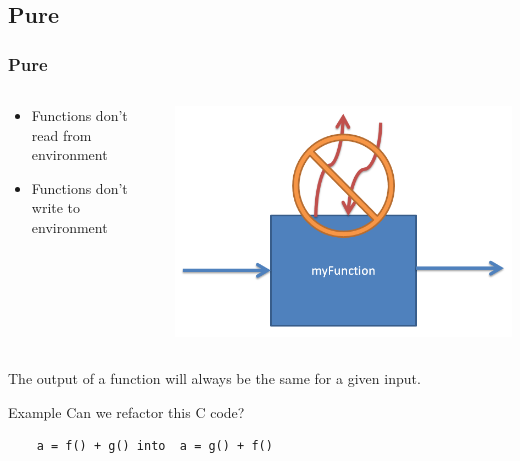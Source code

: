 \documentclass{beamer}
\begin{document}
\subsection{Pure}
\begin{frame}[fragile]
\frametitle{Pure}

 \begin{columns}[]
  \begin{column}[]{5cm}
   \begin{itemize}
    \item Functions don't read from environment
    \item Functions don't write to environment
   \end{itemize}
  \end{column}
  \begin{column}[]{5cm}
    \includegraphics[width=1\linewidth]{figs/pure}
  \end{column}
 \end{columns}
 The output of a function will always be the same for a given input.
 
 \begin{block}{Example}
  Can we refactor this C code?
  \begin{lstlisting}
    a = f() + g() into  a = g() + f()
  \end{lstlisting}
 \end{block}
 
\end{frame}
\end{document}
